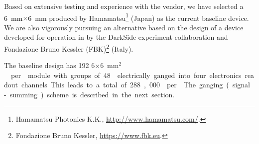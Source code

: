 Based on extensive testing and experience with the vendor, we have selected a \SI{6}{mm}$\times$\SI{6}{mm}  %
produced by Hamamatsu\footnote{Hamamatsu\texttrademark{} Photonics K.K., \url{http://www.hamamatsu.com/}.} (Japan) as the current baseline  device. %
We are also vigorously pursuing an alternative based on the design of a device developed for operation in \lar by the DarkSide experiment collaboration and Fondazione Bruno Kessler (FBK)\footnote{Fondazione Bruno Kessler\texttrademark{}, \url{https://www.fbk.eu}.} (Italy).

The baseline  design has 192 \num{6}$\times$\SI{6}{mm$^2$}  per  module with groups of 48  electrically ganged into four electronics readout channels. This leads to a total of 288,000  per . The ganging (signal-summing) scheme is described in the next section.





